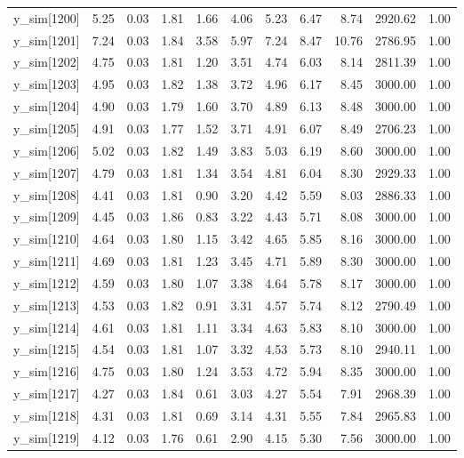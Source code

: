 \begin{table}[ht]
\begin{tabular}{rrrrrrrrrrr}
  y\_sim[1200] & 5.25 & 0.03 & 1.81 & 1.66 & 4.06 & 5.23 & 6.47 & 8.74 & 2920.62 & 1.00 \\ 
  y\_sim[1201] & 7.24 & 0.03 & 1.84 & 3.58 & 5.97 & 7.24 & 8.47 & 10.76 & 2786.95 & 1.00 \\ 
  y\_sim[1202] & 4.75 & 0.03 & 1.81 & 1.20 & 3.51 & 4.74 & 6.03 & 8.14 & 2811.39 & 1.00 \\ 
  y\_sim[1203] & 4.95 & 0.03 & 1.82 & 1.38 & 3.72 & 4.96 & 6.17 & 8.45 & 3000.00 & 1.00 \\ 
  y\_sim[1204] & 4.90 & 0.03 & 1.79 & 1.60 & 3.70 & 4.89 & 6.13 & 8.48 & 3000.00 & 1.00 \\ 
  y\_sim[1205] & 4.91 & 0.03 & 1.77 & 1.52 & 3.71 & 4.91 & 6.07 & 8.49 & 2706.23 & 1.00 \\ 
  y\_sim[1206] & 5.02 & 0.03 & 1.82 & 1.49 & 3.83 & 5.03 & 6.19 & 8.60 & 3000.00 & 1.00 \\ 
  y\_sim[1207] & 4.79 & 0.03 & 1.81 & 1.34 & 3.54 & 4.81 & 6.04 & 8.30 & 2929.33 & 1.00 \\ 
  y\_sim[1208] & 4.41 & 0.03 & 1.81 & 0.90 & 3.20 & 4.42 & 5.59 & 8.03 & 2886.33 & 1.00 \\ 
  y\_sim[1209] & 4.45 & 0.03 & 1.86 & 0.83 & 3.22 & 4.43 & 5.71 & 8.08 & 3000.00 & 1.00 \\ 
  y\_sim[1210] & 4.64 & 0.03 & 1.80 & 1.15 & 3.42 & 4.65 & 5.85 & 8.16 & 3000.00 & 1.00 \\ 
  y\_sim[1211] & 4.69 & 0.03 & 1.81 & 1.23 & 3.45 & 4.71 & 5.89 & 8.30 & 3000.00 & 1.00 \\ 
  y\_sim[1212] & 4.59 & 0.03 & 1.80 & 1.07 & 3.38 & 4.64 & 5.78 & 8.17 & 3000.00 & 1.00 \\ 
  y\_sim[1213] & 4.53 & 0.03 & 1.82 & 0.91 & 3.31 & 4.57 & 5.74 & 8.12 & 2790.49 & 1.00 \\ 
  y\_sim[1214] & 4.61 & 0.03 & 1.81 & 1.11 & 3.34 & 4.63 & 5.83 & 8.10 & 3000.00 & 1.00 \\ 
  y\_sim[1215] & 4.54 & 0.03 & 1.81 & 1.07 & 3.32 & 4.53 & 5.73 & 8.10 & 2940.11 & 1.00 \\ 
  y\_sim[1216] & 4.75 & 0.03 & 1.80 & 1.24 & 3.53 & 4.72 & 5.94 & 8.35 & 3000.00 & 1.00 \\ 
  y\_sim[1217] & 4.27 & 0.03 & 1.84 & 0.61 & 3.03 & 4.27 & 5.54 & 7.91 & 2968.39 & 1.00 \\ 
  y\_sim[1218] & 4.31 & 0.03 & 1.81 & 0.69 & 3.14 & 4.31 & 5.55 & 7.84 & 2965.83 & 1.00 \\ 
  y\_sim[1219] & 4.12 & 0.03 & 1.76 & 0.61 & 2.90 & 4.15 & 5.30 & 7.56 & 3000.00 & 1.00 \\ 

\end{tabular}
\end{table}
